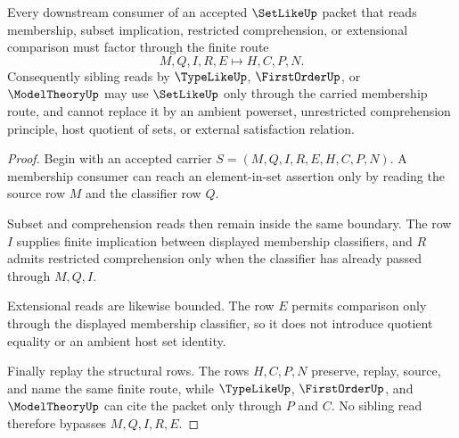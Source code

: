 \begin{theorem}
\label{thm:setlike-membership-route}
Every downstream consumer of an accepted $\SetLikeUp$ packet that reads membership, subset implication, restricted comprehension, or extensional comparison must factor through the finite route
$$
M,Q,I,R,E \longmapsto H,C,P,N .
$$
Consequently sibling reads by $\TypeLikeUp$, $\FirstOrderUp$, or $\ModelTheoryUp$ may use $\SetLikeUp$ only through the carried membership route, and cannot replace it by an ambient powerset, unrestricted comprehension principle, host quotient of sets, or external satisfaction relation.
\end{theorem}
\begin{proof}
Begin with an accepted carrier $S=(M,Q,I,R,E,H,C,P,N)$. A membership consumer can reach an element-in-set assertion only by reading the source row $M$ and the classifier row $Q$.

Subset and comprehension reads then remain inside the same boundary. The row $I$ supplies finite implication between displayed membership classifiers, and $R$ admits restricted comprehension only when the classifier has already passed through $M,Q,I$.

Extensional reads are likewise bounded. The row $E$ permits comparison only through the displayed membership classifier, so it does not introduce quotient equality or an ambient host set identity.

Finally replay the structural rows. The rows $H,C,P,N$ preserve, replay, source, and name the same finite route, while $\TypeLikeUp$, $\FirstOrderUp$, and $\ModelTheoryUp$ can cite the packet only through $P$ and $C$. No sibling read therefore bypasses $M,Q,I,R,E$.
\end{proof}





